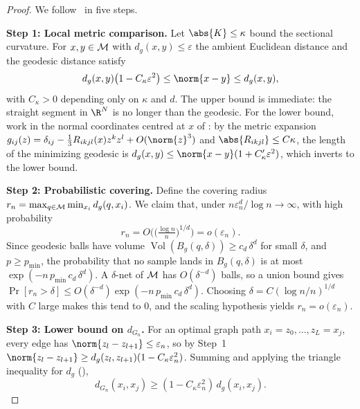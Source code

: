 \begin{proof}
We follow~\citet{bernstein2000graph} in five steps.

\textbf{Step 1: Local metric comparison.} Let $\abs{K} \le \kappa$ bound the
sectional curvature. For $x, y \in \mathcal{M}$ with $d_g(x,y) \le \varepsilon$ the
ambient Euclidean distance and the geodesic distance satisfy
\begin{equation}
\label{eq:geo:local-comparison}
  d_g(x,y)\big(1 - C_\kappa \varepsilon^2\big) \le \norm{x - y} \le d_g(x,y),
\end{equation}
with $C_\kappa > 0$ depending only on $\kappa$ and $d$. The upper bound is
immediate: the straight segment in $\R^N$ is no longer than the geodesic. For
the lower bound, work in the normal coordinates centred at $x$ of
: by the metric
expansion $g_{ij}(z) = \delta_{ij} - \tfrac13 R_{ikjl}(x)z^k z^l +
O(\norm{z}^3)$ and $\abs{R_{ikjl}} \le C\kappa$, the length of the minimizing
geodesic is $d_g(x,y) \le \norm{x-y}(1 + C'_\kappa \varepsilon^2)$, which
inverts to the lower bound.

\textbf{Step 2: Probabilistic covering.} Define the covering radius
$r_n = \max_{q \in \mathcal{M}} \min_{x_i} d_g(q, x_i)$. We claim that, under
$n\varepsilon_n^d/\log n \to \infty$, with high probability
\begin{equation}
\label{eq:geo:covering}
  r_n = O\!\Big(\big(\tfrac{\log n}{n}\big)^{1/d}\Big) = o(\varepsilon_n).
\end{equation}
Since geodesic balls have volume $\operatorname{Vol}(B_g(q,\delta)) \ge
c_d\,\delta^d$ for small $\delta$, and $p \ge p_{\min}$, the probability that no
sample lands in $B_g(q,\delta)$ is at most
$\exp(-n\,p_{\min}\,c_d\,\delta^d)$. A $\delta$-net of $\mathcal{M}$ has $O(\delta^{-d})$
balls, so a union bound gives
$\Pr[r_n > \delta] \le O(\delta^{-d})\exp(-n\,p_{\min}\,c_d\,\delta^d)$.
Choosing $\delta = C(\log n / n)^{1/d}$ with $C$ large makes this tend to $0$,
and the scaling hypothesis yields $r_n = o(\varepsilon_n)$.

\textbf{Step 3: Lower bound on $d_{G_n}$.} For an optimal graph path
$x_i = z_0, \dots, z_L = x_j$, every edge has
$\norm{z_l - z_{l+1}} \le \varepsilon_n$, so by Step~1
$\norm{z_l - z_{l+1}} \ge d_g(z_l, z_{l+1})(1 - C_\kappa \varepsilon_n^2)$.
Summing and applying the triangle inequality for $d_g$
(),
\begin{equation}
\label{eq:geo:lower-dGn}
  d_{G_n}(x_i, x_j) \ge (1 - C_\kappa \varepsilon_n^2)\, d_g(x_i, x_j).
\end{equation}


\end{proof}
